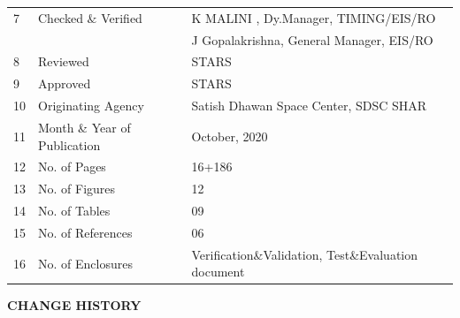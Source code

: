 \documentclass[a4paper, 12pt, oneside]{Thesis}  %
\begin{document}
\begin{table}[h]
\begin{tabular}{@{}lll@{}}
			7              & Checked $\&$ Verified   & K MALINI , Dy.Manager, TIMING/EIS/RO           \\                  
			& & J Gopalakrishna, General Manager, EIS/RO      \\
			8              & Reviewed                     & STARS                                          \\
			9              & Approved                     & STARS                                          \\
			10             & Originating Agency           & Satish Dhawan Space Center, SDSC SHAR          \\
			11             & Month \& Year of Publication & October, 2020                                  \\
			12             & No. of Pages                 & 16+186                                             \\
			13             & No. of Figures               & 12                                             \\
			14             & No. of Tables                & 09                                             \\
			15             & No. of References            & 06                                             \\
			16             & No. of Enclosures            & Verification\&Validation, Test\&Evaluation document                                            \\ \bottomrule
		\end{tabular}
		
		
	\end{table}
	
	\parbox{2.9in}{
		
	}  
	
\clearpage
\clearpage
\vspace*{36pt}
\begin{center}
{\large \bf CHANGE HISTORY}
\end{center}


\vspace*{24pt}
\end{document}
